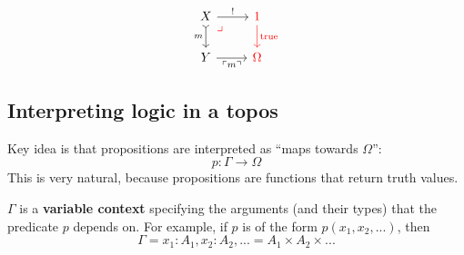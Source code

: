 \begin{equation}
\begin{tikzcd}[column sep = normal]
X \arrow[r, "!"] \arrow[d, tail, swap, "m"] \arrow[dr, phantom, "\lrcorner", red, very near start] & {\color{red}1} \arrow[d, red, "\mathrm{true}"] \\
Y \arrow[r, swap, "\ulcorner m \urcorner"] & {\color{red}\Omega}
\end{tikzcd}
\end{equation}

\subsection{Interpreting logic in a topos}

Key idea is that propositions are interpreted as ``maps towards $\Omega$'':
\begin{equation}
p: \Gamma \rightarrow \Omega
\label{eqn:proposition-in-topos}
\end{equation}
This is very natural, because propositions are functions that return truth values.

$\Gamma$ is a \textbf{variable context} specifying the arguments (and their types) that the predicate $p$ depends on.  For example, if $p$ is of the form $p(x_1, x_2, ...)$, then
\begin{equation}
\Gamma = x_1{:}A_1, x_2{:}A_2, ... = A_1 \times A_2 \times ...
\end{equation}


